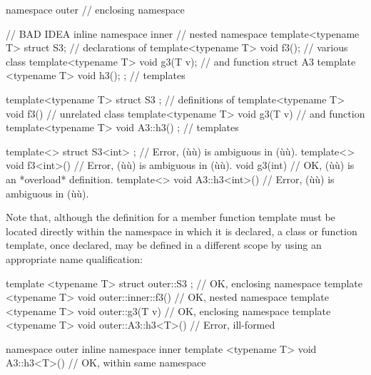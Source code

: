 \begin{emcppslisting}[emcppsbatch=e8]
namespace outer                                          // enclosing namespace
{                                                        // BAD IDEA
    inline namespace inner                               // nested namespace
    {
        template<typename T> struct S3;                  // declarations of
        template<typename T> void f3();                  // various class
        template<typename T> void g3(T v);               // and function
        struct A3 { template <typename T> void h3(); };  // templates
    }

    template<typename T> struct S3 { };                  // definitions of
    template<typename T> void f3() { }                   // unrelated class
    template<typename T> void g3(T v) { }                // and function
    template<typename T> void A3::h3() { };              // templates

    template<> struct S3<int> { };     // Error, (ù{}ù) is ambiguous in (ù{}ù).
    template<> void f3<int>() { }      // Error, (ù{}ù) is ambiguous in (ù{}ù).
    void g3(int) { }                   // OK, (ù{}ù) is an *overload* definition.
    template<> void A3::h3<int>() { }  // Error, (ù{}ù) is ambiguous in (ù{}ù).
}
\end{emcppslisting}
    
\noindent Note that, although the definition for a member function template must
be located directly within the namespace in which it is declared, a
class or function template, once declared, may be defined in a different
scope by using an appropriate name qualification:

\begin{emcppslisting}[emcppsbatch=e8]
template <typename T> struct outer::S3 { };        // OK, enclosing namespace
template <typename T> void outer::inner::f3() { }  // OK, nested namespace
template <typename T> void outer::g3(T v) { }      // OK, enclosing namespace
template <typename T> void outer::A3::h3<T>() { }  // Error, ill-formed

namespace outer
{
    inline namespace inner
    {
        template <typename T> void A3::h3<T>() { } // OK, within same namespace
    }
}
\end{emcppslisting}
    
